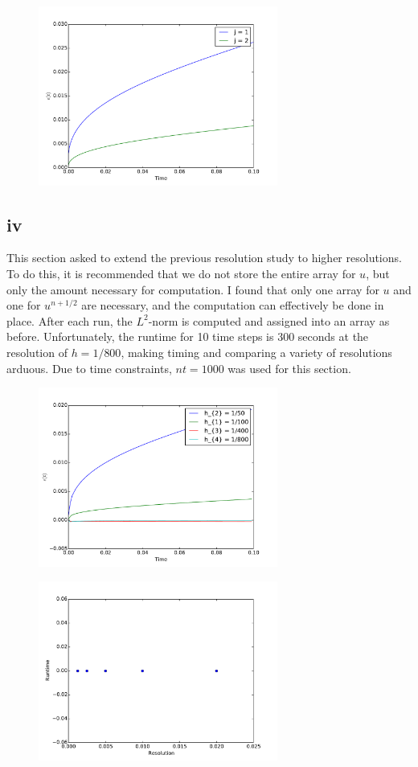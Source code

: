 \documentclass{article}
\begin{document}
\begin{figure}
  \centering
  \includegraphics[width=0.7\textwidth]{2/3/plot.pdf}
  \caption{}
  \label{f:3}
\end{figure}

\subsection*{iv}
This section asked to extend the previous resolution study to higher resolutions. To do this, it is recommended
that we do not store the entire array for $u$, but only the amount necessary for computation.
I found that only one array for $u$ and one for $u^{n+1/2}$ are necessary, and the computation
can effectively be done in place. After each run, the $L^2$-norm is computed and assigned into an array
as before. Unfortunately, the runtime for 10 time steps is 300 seconds at the resolution of $h = 1/800$,
making timing and comparing a variety of resolutions arduous. Due to time constraints, $nt=1000$ was used
for this section.


\begin{figure}
  \centering
  \includegraphics[width=0.7\textwidth]{2/4/plot.pdf}
  \caption{}
  \label{f:41}
\end{figure}

\begin{figure}
  \centering
  \includegraphics[width=0.7\textwidth]{2/4/resolution.pdf}
  \caption{}
  \label{f:42}
\end{figure}
\end{document}
